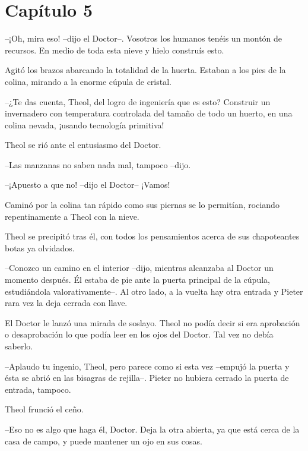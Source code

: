 \chapter*{Capítulo 5}

--¡Oh, mira eso! --dijo el Doctor--. Vosotros los humanos tenéis un montón de recursos. En medio de toda esta nieve y hielo construís esto. 

Agitó los brazos abarcando la totalidad de la huerta. Estaban a los pies de la colina, mirando a la enorme cúpula de cristal.

--¿Te das cuenta, Theol, del logro de ingeniería que es esto? Construir un invernadero con temperatura controlada del tamaño de todo un huerto, en una colina nevada, ¡usando tecnología primitiva!



Theol se rió ante el entusiasmo del Doctor.

 --Las manzanas no saben nada mal, tampoco --dijo.



--¡Apuesto a que no! --dijo el Doctor-- ¡Vamos!



Caminó por la colina tan rápido como sus piernas se lo permitían, rociando repentinamente a Theol con la nieve.



Theol se precipitó tras él, con todos los pensamientos acerca de sus chapoteantes botas ya olvidados.

--Conozco un camino en el interior --dijo, mientras alcanzaba al Doctor un momento después. Él estaba de pie ante la puerta principal de la cúpula, estudiándola valorativamente--. Al otro lado, a la vuelta hay otra entrada y Pieter rara vez la deja cerrada con llave.



El Doctor le lanzó una mirada de soslayo. Theol no podía decir si era aprobación o desaprobación lo que podía leer en los ojos del Doctor. Tal vez no debía saberlo.

 --Aplaudo tu ingenio, Theol, pero parece como si esta vez --empujó la puerta y ésta se abrió en las bisagras de rejilla--. Pieter no hubiera cerrado la puerta de entrada, tampoco.



Theol frunció el ceño.

--Eso no es algo que haga él, Doctor. Deja la otra abierta, ya que está cerca de la casa de campo, y puede mantener un ojo en sus cosas.



